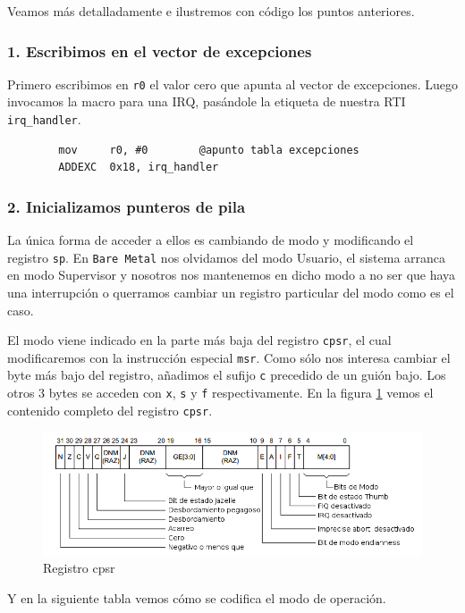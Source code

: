 Veamos más detalladamente e ilustremos con código los puntos anteriores.

\subsubsection{1. Escribimos en el vector de excepciones}

  Primero escribimos en {\tt r0} el valor cero que apunta al vector de excepciones.
  Luego invocamos la macro para una IRQ, pasándole la etiqueta de nuestra RTI {\tt irq\_handler}.
\begin{lstlisting}
        mov     r0, #0        @apunto tabla excepciones
        ADDEXC  0x18, irq_handler
\end{lstlisting}

\subsubsection{2. Inicializamos punteros de pila}

La única forma de acceder a ellos es cambiando de modo y modificando el registro {\tt sp}. En
{\tt Bare Metal} nos olvidamos del modo Usuario, el sistema arranca en modo Supervisor y
nosotros nos mantenemos en dicho modo a no ser que haya una interrupción o querramos cambiar
un registro particular del modo como es el caso.

El modo viene indicado en la parte más baja del registro {\tt cpsr}, el cual modificaremos
con la instrucción especial {\tt msr}. Como sólo nos interesa cambiar el byte más bajo del
registro, añadimos el sufijo {\tt c} precedido de un guión bajo. Los otros 3 bytes se acceden
con {\tt x}, {\tt s} y {\tt f} respectivamente. En la figura \ref{fig:cpsr} vemos el contenido
completo del registro {\tt cpsr}.

\begin{figure}[h]
  \centering
    \includegraphics[width=14cm]{graphs/cpsr.png}
  \caption{Registro cpsr}
  \label{fig:cpsr}
\end{figure}

Y en la siguiente tabla vemos cómo se codifica el modo de operación.

